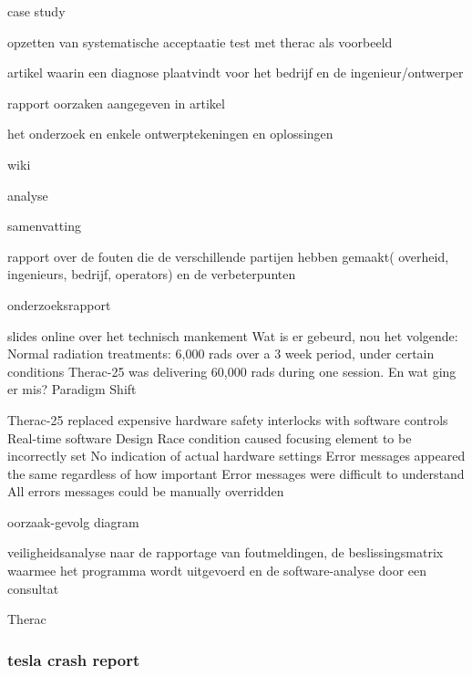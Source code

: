\cite{huffbrown2004casestudyethicatherac}
case study

\cite{sebowikimedicalradiation}
opzetten van systematische acceptaatie test met therac als voorbeeld

\cite{hsia1995testtherac25}
artikel waarin een diagnose plaatvindt voor het bedrijf en de ingenieur/ontwerper

\cite{magsilvaTheracTesting}
rapport
oorzaken aangegeven in artikel

\cite{chemeuropetherac25}
het onderzoek en enkele ontwerptekeningen en oplossingen

\cite{statsenko10102016Therackillerbug}

\cite{therac25casestudy}

\cite{thomas1994theracinLotos}

\cite{twitter2019programmerbehindtherac}
wiki

\cite{wikibookstherac}
analyse

\cite{bozdagTherac25}
samenvatting


\cite{levesonTurnerTheracAbstract}

rapport over de fouten die de verschillende partijen hebben gemaakt( overheid, ingenieurs, bedrijf, operators) en de verbeterpunten


onderzoeksrapport


slides online over het technisch mankement
Wat is er gebeurd, nou het volgende:
Normal radiation treatments: 6,000 rads over a 3 week period, under certain conditions Therac-25 was delivering 60,000 rads during one session.
En wat ging er mis?
Paradigm Shift

Therac-25 replaced expensive hardware safety interlocks with software controls
Real-time software
Design
Race condition caused focusing element to be incorrectly set
No indication of actual hardware settings
Error messages appeared the same regardless of how important
Error messages were difficult to understand
All errors messages could be manually overridden



oorzaak-gevolg diagram


veiligheidsanalyse naar de rapportage van foutmeldingen, de beslissingsmatrix waarmee het programma wordt uitgevoerd en de software-analyse door een consultat

\cite{stackexchange2021therac25code}



Therac


\subsubsection{tesla crash report}

